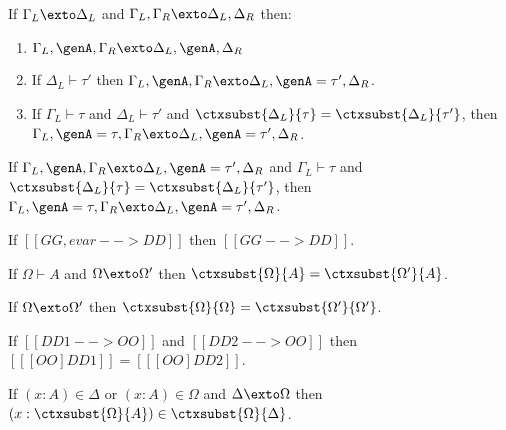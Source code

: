 \begin{lemma}   \label{lemma:paralell_admit}
  If $\Gamma_L \exto \Delta_L$ and $\Gamma_L, \Gamma_R \exto \Delta_L, \Delta_R$ then:
  \begin{enumerate}
  \item $\Gamma_L, \genA, \Gamma_R \exto \Delta_L, \genA, \Delta_R$
  \item If $\Delta_L \vdash \tau'$ then $\Gamma_L, \genA, \Gamma_R \exto \Delta_L, \genA = \tau', \Delta_R$.
  \item If $\Gamma_L \vdash \tau$ and $\Delta_L \vdash \tau'$ and $\ctxsubst{\Delta_L}{\tau} = \ctxsubst{\Delta_L}{\tau'}$, then $\Gamma_L, \genA = \tau, \Gamma_R \exto \Delta_L, \genA = \tau', \Delta_R$.
  \end{enumerate}
\end{lemma}

\begin{lemma} \label{lemma:paralell_ext_solu}
  If $\Gamma_L, \genA, \Gamma_R \exto \Delta_L, \genA = \tau', \Delta_R$ and
  $\Gamma_L \vdash \tau$ and $\ctxsubst{\Delta_L}{\tau} =
  \ctxsubst{\Delta_L}{\tau'}$, then $\Gamma_L, \genA = \tau, \Gamma_R \exto
  \Delta_L, \genA = \tau', \Delta_R$.
\end{lemma}




\begin{lemma}   \label{lemma:drop_ext}
  If $[[ GG, evar --> DD  ]]$ then $[[ GG --> DD]]$.
\end{lemma}


\begin{lemma}
  If $\Omega \vdash A$ and $\Omega \exto \Omega'$ then $\ctxsubst{\Omega}{A} = \ctxsubst{\Omega'}{A}$.
  \label{lemma:finish_types}
\end{lemma}


\begin{lemma}
  If $\Omega \exto \Omega'$ then $\ctxsubst{\Omega}{\Omega} = \ctxsubst{\Omega'}{\Omega'}$.
  \label{lemma:finish_complete}
\end{lemma}



\begin{lemma}   \label{lemma:confluence}
  If $[[  DD1 --> OO]]$ and $[[ DD2 --> OO]]$ then
  $[[ [OO]DD1 ]]  =  [[ [OO] DD2  ]]$.
\end{lemma}


\begin{lemma}
  If $(x : A) \in \Delta$ or $(x : A) \in \Omega$ and $\Delta \exto \Omega$ then $(x : \ctxsubst{\Omega}{A}) \in \ctxsubst{\Omega}{\Delta}$.
  \label{lemma:variable_preservation}
\end{lemma}


